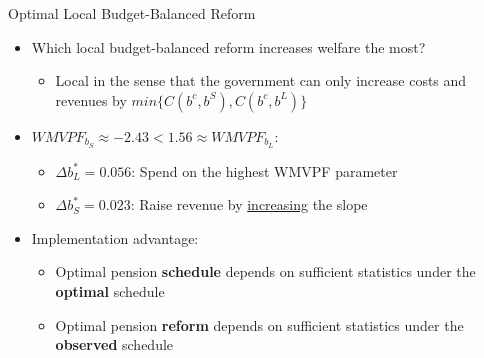\begin{frame}[label=optimal]{Optimal Local Budget-Balanced Reform}
    \begin{itemize}
        \item Which local budget-balanced reform increases welfare the most?
        \begin{itemize}
            \item Local in the sense that the government can only increase costs and revenues by $min\{C(b^c,b^S),C(b^c,b^L)\}$
        \end{itemize}
        \item $WMVPF_{b_S} \approx -2.43<1.56\approx WMVPF_{b_L}$:
        \begin{itemize}
            \item $\Delta b_L^*=0.056$: Spend on the highest WMVPF parameter
            \item $\Delta b_S^*=0.023$: Raise revenue by \underline{increasing} the slope
        \end{itemize}
        \item Implementation advantage:
        \begin{itemize}
            \item Optimal pension \textbf{schedule} depends on sufficient statistics under the \textbf{optimal} schedule
            \item Optimal pension \textbf{reform} depends on sufficient statistics under the \textbf{observed} schedule
        \end{itemize}
    \end{itemize}
\end{frame}

